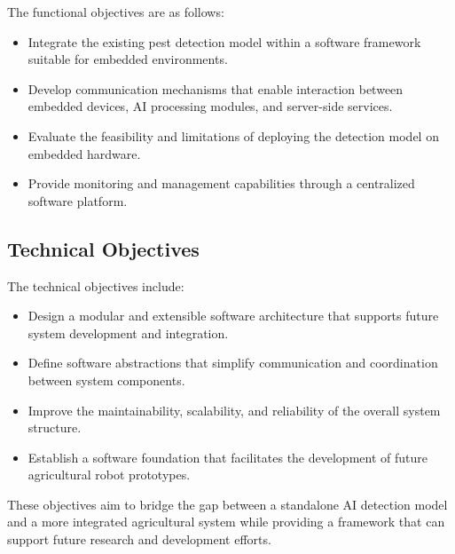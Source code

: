 The functional objectives are as follows:
\begin{itemize}
    \item Integrate the existing pest detection model within a software framework suitable for embedded environments.
    \item Develop communication mechanisms that enable interaction between embedded devices, AI processing modules, and server-side services.
    \item Evaluate the feasibility and limitations of deploying the detection model on embedded hardware.
    \item Provide monitoring and management capabilities through a centralized software platform.
\end{itemize}

\subsection{Technical Objectives}

The technical objectives include:
\begin{itemize}
    \item Design a modular and extensible software architecture that supports future system development and integration.
    \item Define software abstractions that simplify communication and coordination between system components.
    \item Improve the maintainability, scalability, and reliability of the overall system structure.
    \item Establish a software foundation that facilitates the development of future agricultural robot prototypes.
\end{itemize}

\noindent These objectives aim to bridge the gap between a standalone AI detection model and a more integrated agricultural system while providing a framework that can support future research and development efforts.
